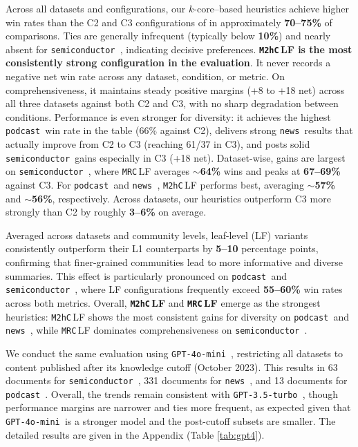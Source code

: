 \documentclass[sigconf]{acmart}
\newcommand{\MHC}{\texttt{M2hC}\,}
\newcommand{\MRC}{\texttt{MRC}\,}
\newcommand{\threepointfive}{\texttt{GPT-3.5-turbo\,}}
\newcommand{\four}{\texttt{GPT-4o-mini\,}}
\newcommand{\podcast}{\texttt{podcast\,}}
\newcommand{\news}{\texttt{news\,}}
\newcommand{\semi}{\texttt{semiconductor\,}}
\begin{document}
Across all datasets and configurations, our $k$-core–based heuristics achieve higher win rates than the C2 and C3 configurations of \citeauthor{edge24} in approximately \textbf{70--75\%} of comparisons.
 Ties are generally infrequent (typically below \textbf{10\%}) and nearly absent for \semi, indicating decisive preferences.
{\bf \MHC LF is the most consistently strong configuration in the evaluation}. It never records a negative net win rate across any dataset, condition, or metric. On comprehensiveness, it maintains steady positive margins (+8 to +18 net) across all three datasets against both C2 and C3, with no sharp degradation between conditions.
Performance is even stronger for diversity: it achieves the highest \podcast win rate in the table (66\% against C2), delivers strong \news results that actually improve from C2 to C3 (reaching 61/37 in C3), and posts solid \semi gains especially in C3 (+18 net).
Dataset-wise, gains are largest on \semi, where \MRC LF averages \textbf{$\sim$64\%} wins and peaks at \textbf{67--69\%} against C3. 
For \podcast and \news, \MHC LF performs best, averaging \textbf{$\sim$57\%} and \textbf{$\sim$56\%}, respectively. 
Across datasets, our heuristics outperform C3 more strongly than C2 by roughly \textbf{3--6\%} on average.

Averaged across datasets and community levels, leaf-level (LF) variants consistently outperform their L1 counterparts by \textbf{5--10} percentage points, confirming that finer-grained communities lead to more informative and diverse summaries. 
This effect is particularly pronounced on \podcast and \semi, where LF configurations frequently exceed \textbf{55--60\%} win rates across both metrics.
Overall, \textbf{\MHC LF} and \textbf{\MRC LF} emerge as the strongest heuristics: \MHC LF shows the most consistent gains for diversity on \podcast and \news, while \MRC LF dominates comprehensiveness on \semi.

We conduct the same evaluation using \four, restricting all datasets to content published after its knowledge cutoff (October 2023). This results in 63 documents for \semi, 331 documents for \news, and 13 documents for  \podcast.
Overall, the trends remain consistent with \threepointfive, though performance margins are narrower and ties more frequent, as expected given that \four is a stronger model and the post-cutoff subsets are smaller.
The detailed results are given in the %
Appendix (Table \ref{tab:gpt4}).\\
\end{document}
